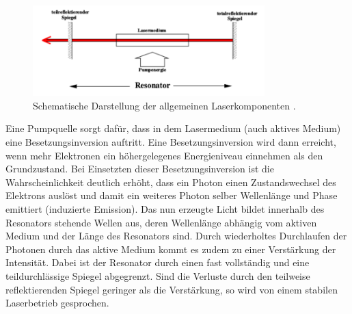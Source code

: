 \begin{figure}[htb]
  \centering
  \includegraphics[width=0.8\textwidth]{images/V61.pdf}
  \caption{Schematische Darstellung der allgemeinen Laserkomponenten \cite{anleitung2}.}
  \label{fig:laser}
\end{figure}
Eine Pumpquelle sorgt dafür, dass in dem Lasermedium (auch aktives Medium)
eine Besetzungsinversion auftritt. Eine Besetzungsinversion wird dann erreicht,
wenn mehr Elektronen ein höhergelegenes Energieniveau einnehmen als den
Grundzustand. Bei Einsetzten dieser Besetzungsinversion ist
die Wahrscheinlichkeit deutlich erhöht, dass ein Photon einen Zustandswechsel
des Elektrons auslöst und damit ein weiteres Photon selber Wellenlänge
und Phase emittiert (induzierte Emission). Das nun erzeugte Licht bildet innerhalb
des Resonators stehende Wellen aus, deren Wellenlänge abhängig vom aktiven Medium und
der Länge des Resonators sind. Durch wiederholtes Durchlaufen der Photonen durch
das aktive Medium kommt es zudem zu einer Verstärkung der Intensität. Dabei ist der
Resonator durch einen fast vollständig
und eine teildurchlässige Spiegel abgegrenzt. Sind die Verluste durch den teilweise
reflektierenden Spiegel geringer als die Verstärkung, so wird von einem stabilen
Laserbetrieb gesprochen.


